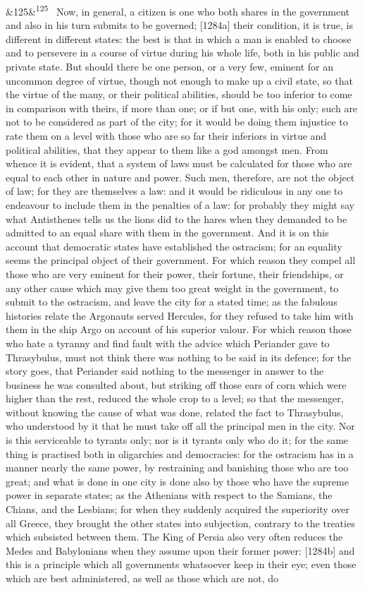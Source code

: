 \documentclass[12pt]{article}
\newcommand{\para}[1][]{\par\noindent\ifx&#1&\else\textsuperscript{\footnotesize #1}~\fi}
\begin{document}
\para[125] Now, in general, a citizen is one who both shares in the government and also in his turn submits to be governed; [1284a] their condition, it is true, is different in different states: the best is that in which a man is enabled to choose and to persevere in a course of virtue during his whole life, both in his public and private state. But should there be one person, or a very few, eminent for an uncommon degree of virtue, though not enough to make up a civil state, so that the virtue of the many, or their political abilities, should be too inferior to come in comparison with theirs, if more than one; or if but one, with his only; such are not to be considered as part of the city; for it would be doing them injustice to rate them on a level with those who are so far their inferiors in virtue and political abilities, that they appear to them like a god amongst men. From whence it is evident, that a system of laws must be calculated for those who are equal to each other in nature and power. Such men, therefore, are not the object of law; for they are themselves a law: and it would be ridiculous in any one to endeavour to include them in the penalties of a law: for probably they might say what Antisthenes tells us the lions did to the hares when they demanded to be admitted to an equal share with them in the government. And it is on this account that democratic states have established the ostracism; for an equality seems the principal object of their government. For which reason they compel all those who are very eminent for their power, their fortune, their friendships, or any other cause which may give them too great weight in the government, to submit to the ostracism, and leave the city for a stated time; as the fabulous histories relate the Argonauts served Hercules, for they refused to take him with them in the ship Argo on account of his superior valour. For which reason those who hate a tyranny and find fault with the advice which Periander gave to Thrasybulus, must not think there was nothing to be said in its defence; for the story goes, that Periander said nothing to the messenger in answer to the business he was consulted about, but striking off those ears of corn which were higher than the rest, reduced the whole crop to a level; so that the messenger, without knowing the cause of what was done, related the fact to Thrasybulus, who understood by it that he must take off all the principal men in the city. Nor is this serviceable to tyrants only; nor is it tyrants only who do it; for the same thing is practised both in oligarchies and democracies: for the ostracism has in a manner nearly the same power, by restraining and banishing those who are too great; and what is done in one city is done also by those who have the supreme power in separate states; as the Athenians with respect to the Samians, the Chians, and the Lesbians; for when they suddenly acquired the superiority over all Greece, they brought the other states into subjection, contrary to the treaties which subsisted between them. The King of Persia also very often reduces the Medes and Babylonians when they assume upon their former power: [1284b] and this is a principle which all governments whatsoever keep in their eye; even those which are best administered, as well as those which are not, do 
\end{document}
